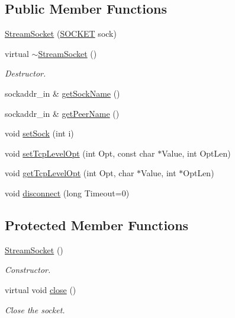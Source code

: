 \subsection*{Public Member Functions}
\begin{DoxyCompactItemize}
\item 
\hyperlink{classStreamSocket_a5b84a10f7bece6175c0d885c3568aa4f}{Stream\+Socket} (\hyperlink{sockclasslib_8h_a8dc8083897335125630f1af5dafd5831}{S\+O\+C\+K\+ET} sock)
\item 
virtual \hyperlink{classStreamSocket_ad19381c15cf7390ea3751d930b16c45e}{$\sim$\+Stream\+Socket} ()
\begin{DoxyCompactList}\small\item\em Destructor. \end{DoxyCompactList}\item 
sockaddr\+\_\+in \& \hyperlink{classStreamSocket_ab634d93813e97a292ae8b29fd9d39bcd}{get\+Sock\+Name} ()
\item 
sockaddr\+\_\+in \& \hyperlink{classStreamSocket_ab9065328673e08e0fb5df8eefda3604d}{get\+Peer\+Name} ()
\item 
void \hyperlink{classStreamSocket_a644c75a180ea636ab4373a903062a4ad}{set\+Sock} (int i)
\item 
void \hyperlink{classStreamSocket_a776cd788e6f324f41febfb71b03e8cc7}{set\+Tcp\+Level\+Opt} (int Opt, const char $\ast$Value, int Opt\+Len)
\item 
void \hyperlink{classStreamSocket_a5ad690e49784bbfa352232724529ae4c}{get\+Tcp\+Level\+Opt} (int Opt, char $\ast$Value, int $\ast$Opt\+Len)
\item 
void \hyperlink{classStreamSocket_a01cd43dea5b792a72d741288f840b08b}{disconnect} (long Timeout=0)
\end{DoxyCompactItemize}
\subsection*{Protected Member Functions}
\begin{DoxyCompactItemize}
\item 
\hyperlink{classStreamSocket_a005683fb7badf43a1d0a30b9ad09649e}{Stream\+Socket} ()
\begin{DoxyCompactList}\small\item\em Constructor. \end{DoxyCompactList}\item 
virtual void \hyperlink{classStreamSocket_a9dc930d6a0f7d6a8b96631348297bce2}{close} ()
\begin{DoxyCompactList}\small\item\em Close the socket. \end{DoxyCompactList}\end{DoxyCompactItemize}
